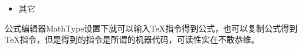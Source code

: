 \begin{itemize}

\item
  其它
\end{itemize}





公式编辑器MathType设置下就可以输入TeX指令得到公式，也可以复制公式得到TeX指令，但是得到的指令是所谓的机器代码，可读性实在不敢恭维。
